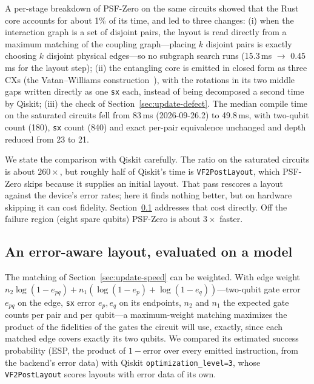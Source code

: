 \documentclass[11pt]{article}
\begin{document}
A per-stage breakdown of PSF-Zero on the same circuits showed that the
Rust core accounts for about 1\% of its time, and led to three changes:
(i) when the interaction graph is a set of disjoint pairs, the layout is
read directly from a maximum matching of the coupling graph---placing
$k$ disjoint pairs is exactly choosing $k$ disjoint physical edges---so
no subgraph search runs (15.3\,ms $\to$ 0.45\,ms for the layout step);
(ii) the entangling core is emitted in closed form as three CXs
(the Vatan--Williams construction~\cite{vatan}), with the rotations in
its two middle gaps written directly as one \texttt{sx} each, instead of
being decomposed a second time by Qiskit; (iii) the check of
Section~\ref{sec:update-defect}. The median compile time on the
saturated circuits fell from 83\,ms (2026-09-26.2) to 49.8\,ms, with
two-qubit count (180), \texttt{sx} count (840) and exact per-pair
equivalence unchanged and depth reduced from 23 to 21.

We state the comparison with Qiskit carefully. The ratio on the saturated
circuits is about $260\times$, but roughly half of Qiskit's time is
\texttt{VF2PostLayout}, which PSF-Zero skips because it supplies an
initial layout. That pass rescores a layout against the device's error
rates; here it finds nothing better, but on hardware skipping it can cost
fidelity. Section~\ref{sec:update-layout} addresses that cost directly.
Off the failure region (eight spare qubits) PSF-Zero is about
$3\times$ faster.

\subsection{An error-aware layout, evaluated on a model}
\label{sec:update-layout}

The matching of Section~\ref{sec:update-speed} can be weighted. With edge
weight $n_2\log(1-e_{pq}) + n_1(\log(1-e_p)+\log(1-e_q))$---two-qubit
gate error $e_{pq}$ on the edge, \texttt{sx} error $e_p, e_q$ on its
endpoints, $n_2$ and $n_1$ the expected gate counts per pair and per
qubit---a maximum-weight matching maximizes the product of the
fidelities of the gates the circuit will use, exactly, since each matched
edge covers exactly its two qubits. We compared its estimated success
probability (ESP, the product of $1-\text{error}$ over every emitted
instruction, from the backend's error data) with Qiskit
\texttt{optimization\_level=3}, whose \texttt{VF2PostLayout} scores
layouts with error data of its own.
\end{document}
